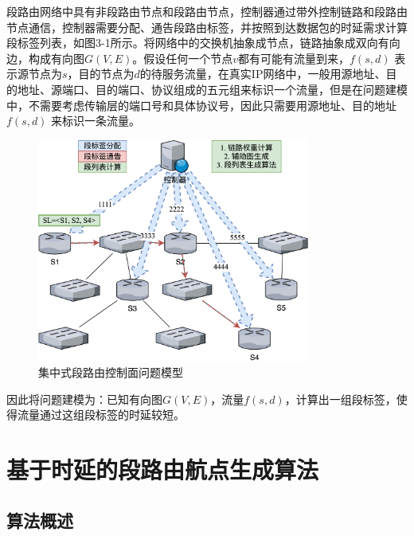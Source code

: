 段路由网络中具有非段路由节点和段路由节点，控制器通过带外控制链路和段路由节点通信，控制器需要分配、通告段路由标签，并按照到达数据包的时延需求计算段标签列表，如图3-1所示。将网络中的交换机抽象成节点，链路抽象成双向有向边，构成有向图$G(V, E)$。假设任何一个节点$v$都有可能有流量到来，$f(s, d)$ 表示源节点为$s$，目的节点为$d$的待服务流量，在真实IP网络中，一般用源地址、目的地址、源端口、目的端口、协议组成的五元组来标识一个流量，但是在问题建模中，不需要考虑传输层的端口号和具体协议号，因此只需要用源地址、目的地址 $f(s, d)$ 来标识一条流量。

\begin{figure}[htbp]
\setlength{\abovecaptionskip}{15pt plus 3pt minus 2pt}
\centerline{\includegraphics[width=0.8\textwidth]{./figures/ch3-problem-model.png}}
\caption{集中式段路由控制面问题模型}
\label{fig-ch3-problem-model}
\end{figure}

因此将问题建模为：已知有向图$G(V, E)$，流量$f(s, d)$，计算出一组段标签，使得流量通过这组段标签的时延较短。

\section{基于时延的段路由航点生成算法}

\subsection{算法概述}

